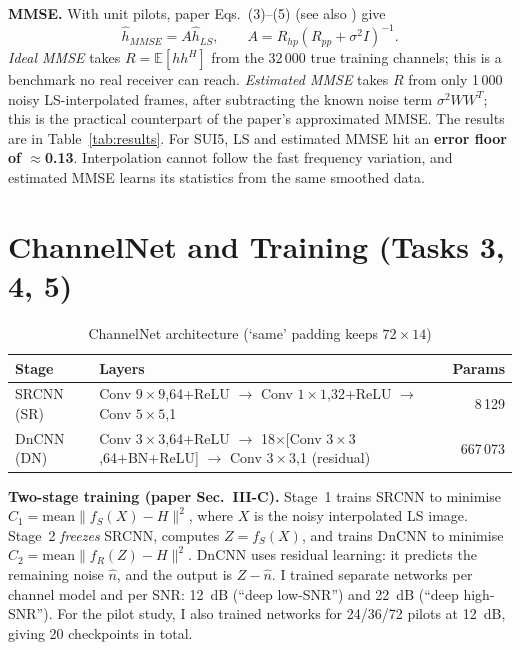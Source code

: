 \documentclass[a4paper,10pt]{article}
\begin{document}
\textbf{MMSE.} With unit pilots, paper Eqs.~(3)--(5) (see also \cite{edfors1998}) give
\begin{equation}
    \hat h_{MMSE}=A\hat h_{LS},\qquad A=R_{hp}\left(R_{pp}+\sigma^2 I\right)^{-1}.
\end{equation}
\textit{Ideal MMSE} takes $R=\mathbb{E}[hh^H]$ from the 32\,000 true training channels; this is a benchmark no real receiver can reach. \textit{Estimated MMSE} takes $R$ from only 1\,000 noisy LS-interpolated frames, after subtracting the known noise term $\sigma^2WW^T$; this is the practical counterpart of the paper's approximated MMSE. The results are in Table~\ref{tab:results}. For SUI5, LS and estimated MMSE hit an \textbf{error floor of $\approx$0.13}. Interpolation cannot follow the fast frequency variation, and estimated MMSE learns its statistics from the same smoothed data.

\section{ChannelNet and Training (Tasks 3, 4, 5)}
\begin{table}[H]
\centering
\caption{ChannelNet architecture (`same' padding keeps $72\times14$)}
\label{tab:arch}
\small
\begin{tabular}{llr}
\toprule
\textbf{Stage} & \textbf{Layers} & \textbf{Params} \\
\midrule
SRCNN (SR) & Conv $9\times9$,64+ReLU $\rightarrow$ Conv $1\times1$,32+ReLU $\rightarrow$ Conv $5\times5$,1 & 8\,129 \\
DnCNN (DN) & Conv $3\times3$,64+ReLU $\rightarrow$ 18$\times$[Conv $3\times3$,64+BN+ReLU] $\rightarrow$ Conv $3\times3$,1 (residual) & 667\,073 \\
\bottomrule
\end{tabular}
\end{table}
\vspace{-0.2cm}
\textbf{Two-stage training (paper Sec.~III-C).} Stage~1 trains SRCNN to minimise $C_1=\text{mean}\|f_S(X)-H\|^2$, where $X$ is the noisy interpolated LS image. Stage~2 \emph{freezes} SRCNN, computes $Z=f_S(X)$, and trains DnCNN to minimise $C_2=\text{mean}\|f_R(Z)-H\|^2$. DnCNN uses residual learning: it predicts the remaining noise $\hat n$, and the output is $Z-\hat n$. I trained separate networks per channel model and per SNR: 12~dB (``deep low-SNR'') and 22~dB (``deep high-SNR''). For the pilot study, I also trained networks for 24/36/72 pilots at 12~dB, giving 20 checkpoints in total.
\end{document}
